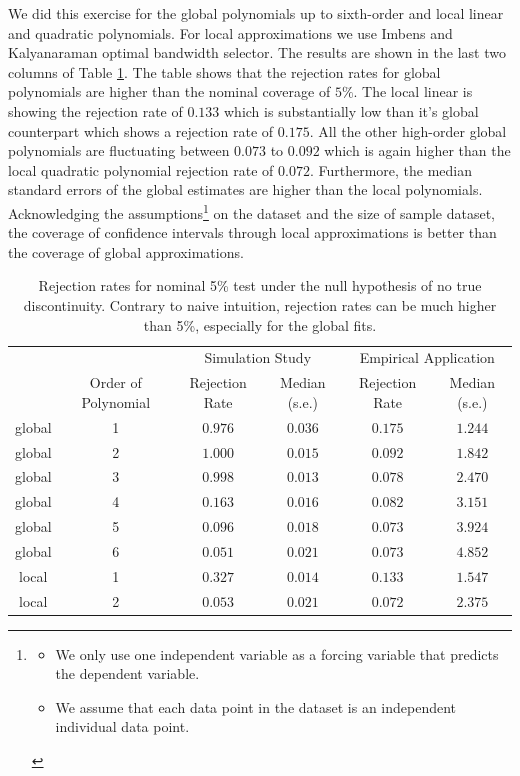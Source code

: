 \documentclass[fleqn]{article}
\begin{document}
    We did this exercise for the global polynomials up to sixth-order and local linear and quadratic polynomials. For local approximations we use Imbens and Kalyanaraman optimal bandwidth selector\cite{imbens2012optimal}. The results are shown in the last two columns of Table \ref{table:arg3}. The table shows that the rejection rates for global polynomials are higher than the nominal coverage of $5\%$. The local linear is showing the rejection rate of $0.133$ which is substantially low than it's global counterpart which shows a rejection rate of $0.175$. All the other high-order global polynomials are fluctuating between $0.073$ to $0.092$ which is again higher than the local quadratic polynomial rejection rate of $0.072$. Furthermore, the median standard errors of the global estimates are higher than the local polynomials. Acknowledging the assumptions\footnote{\begin{itemize}\item We only use one independent variable as a forcing variable that predicts the dependent variable. \item We assume that each data point in the dataset is an independent individual data point.\end{itemize}} on the dataset and the size of sample dataset, the coverage of confidence intervals through local approximations is better than the coverage of global approximations.\\


    \begin{table}[htb]
    \centering
    \caption{Rejection rates for nominal 5\% test under the null hypothesis of no true discontinuity. Contrary to naive intuition, rejection rates can be much higher than 5\%, especially for the global fits.}
    \label{table:arg3}
        \begin{tabular}{cccccc}\\
            \hline
            & & \multicolumn{2}{c}{Simulation Study} & \multicolumn{2}{c}{Empirical Application}\\
            \cline{3-6}
            & Order of Polynomial & Rejection Rate & Median (s.e.) & Rejection Rate & Median (s.e.)\\
            \hline
            global & 1 & $0.976$ & $0.036$ & $0.175$ & $1.244$ \\
            global & 2 & $1.000$ & $0.015$ & $0.092$ & $1.842$ \\
            global & 3 & $0.998$ & $0.013$ & $0.078$ & $2.470$ \\
            global & 4 & $0.163$ & $0.016$ & $0.082$ & $3.151$ \\
            global & 5 & $0.096$ & $0.018$ & $0.073$ & $3.924$ \\
            global & 6 & $0.051$ & $0.021$ & $ 0.073$ & $4.852$ \\
            local & 1 & $0.327$ & $0.014$ & $0.133$ & $1.547$ \\
            local & 2 & $0.053$ & $0.021$ & $0.072$ & $2.375$ \\
            \hline
        \end{tabular} 
    \end{table} 
\end{document}
